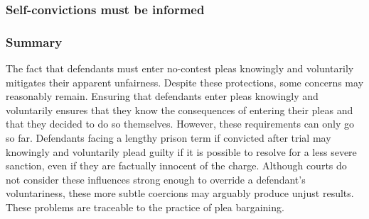 \subsubsection{Self-convictions must be informed}



\subsubsection{Summary}

The fact that defendants must enter no-contest pleas knowingly and voluntarily mitigates their apparent unfairness. Despite these protections, some concerns may reasonably remain. Ensuring that defendants enter pleas knowingly and voluntarily ensures that they know the consequences of entering their pleas and that they decided to do so themselves. However, these requirements can only go so far. Defendants facing a lengthy prison term if convicted after trial may knowingly and voluntarily plead guilty if it is possible to resolve for a less severe sanction, even if they are factually innocent of the charge. Although courts do not consider these influences strong enough to override a defendant's voluntariness, these more subtle coercions may arguably produce unjust results. These problems are traceable to the practice of plea bargaining.